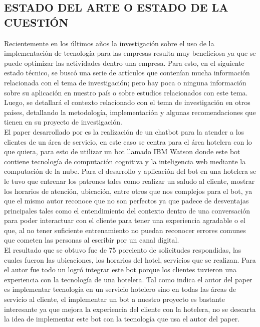 \documentclass[12pt,a4paper,oneside]{article}
\begin{document}
\subsection{ESTADO DEL ARTE O ESTADO DE LA CUESTIÓN}

    Recientemente en los últimos años la investigación sobre el uso de la implementación de tecnología para las empresas resulta muy beneficiosa ya que se puede optimizar las actividades dentro una empresa. Para esto, en el siguiente estado técnico, se buscó una serie de artículos que contenían mucha información relacionada con el tema de investigación; pero hay poca o ninguna información sobre su aplicación en nuestro país o sobre estudios relacionados con este tema. Luego, se detallará el contexto relacionado con el tema de investigación en otros países, detallando la metodología, implementación y algunas recomendaciones que tienen en su proyecto de investigación.\\
    El paper desarrollado por \cite{Felipe2022} es la realización de un chatbot para la atender a los clientes de un área de servicio, en este caso se centra para el área hotelera con lo que quiera, para esto de utilizar un bot llamado IBM Watson donde este bot contiene tecnología de computación cognitiva y la inteligencia web mediante la computación de la nube. Para el desarrollo y aplicación del bot en una hotelera se le tuvo que entrenar los patrones tales como realizar un saludo al cliente, mostrar los horarios de atención, ubicación,  entre otros que nos complejos para el bot, ya que el mismo autor reconoce que no son perfectos ya que padece de desventajas principales tales como el entendimiento del contexto dentro de una conversación para poder interactuar con el cliente para tener una experiencia agradable o el que, al no tener suficiente entrenamiento no puedan reconocer errores comunes que cometen las personas al escribir por un canal digital.\\ El resultado que se obtuvo fue de 75 porciento de solicitudes respondidas, las cuales fueron las ubicaciones, los horarios del hotel, servicios que se realizan. Para el autor fue todo un logró integrar este bot porque los clientes tuvieron una experiencia con la tecnología de una hotelera. Tal como indica el autor del paper es implementar tecnología en un servicio hotelero sino en todas las áreas de servicio al cliente, el implementar un bot a nuestro proyecto es bastante interesante ya que mejora la experiencia del cliente con la hotelera, no se descarta la idea de implementar este bot con la tecnología que usa el autor del paper. 
\end{document}
